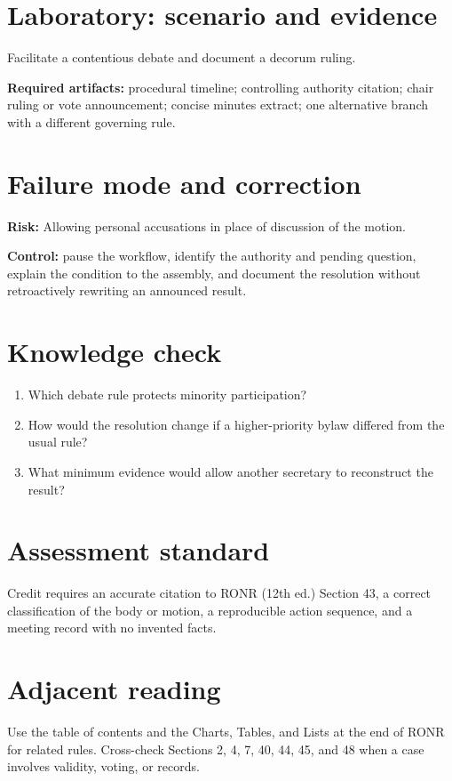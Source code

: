 \documentclass[11pt]{article}
\begin{document}
\section{Laboratory: scenario and evidence}
Facilitate a contentious debate and document a decorum ruling.

\textbf{Required artifacts:} procedural timeline; controlling authority citation; chair ruling or vote announcement; concise minutes extract; one alternative branch with a different governing rule.

\section{Failure mode and correction}
\textbf{Risk:} Allowing personal accusations in place of discussion of the motion.

\textbf{Control:} pause the workflow, identify the authority and pending question, explain the condition to the assembly, and document the resolution without retroactively rewriting an announced result.

\section{Knowledge check}
\begin{enumerate}[leftmargin=*,itemsep=4pt]
\item Which debate rule protects minority participation?
\item How would the resolution change if a higher-priority bylaw differed from the usual rule?
\item What minimum evidence would allow another secretary to reconstruct the result?
\end{enumerate}

\section{Assessment standard}
Credit requires an accurate citation to RONR (12th ed.) Section 43, a correct classification of the body or motion, a reproducible action sequence, and a meeting record with no invented facts.

\section{Adjacent reading}
Use the table of contents and the Charts, Tables, and Lists at the end of RONR for related rules. Cross-check Sections 2, 4, 7, 40, 44, 45, and 48 when a case involves validity, voting, or records.
\end{document}
